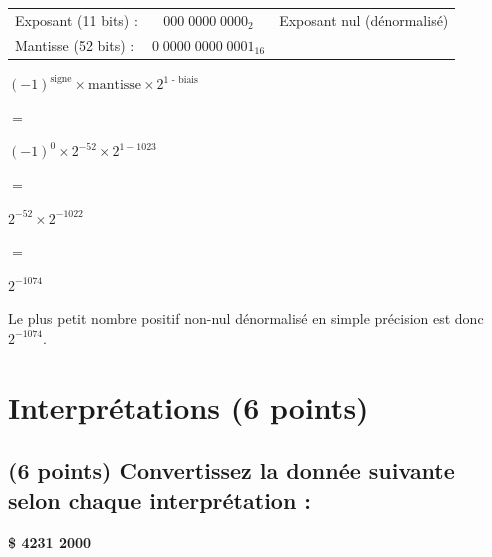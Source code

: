 \documentclass[11pt,a4paper]{article}
\begin{document}
\bigskip

\bigskip

\begin{tabular}{l c l}
Exposant (11 bits) :  & $ 000 \; 0000 \; 0000_{2} $ & Exposant nul (dénormalisé)\\
Mantisse (52 bits) : & $ 0 \; 0000 \; 0000 \; 0001_{16} $ & \\
\end{tabular}

\bigskip

\begin{center}
$ (-1)^{\text{signe}} \times \text{mantisse} \times 2^{\text{1 - biais}} $

\smallskip
$ = $
\smallskip

$ (-1)^{\text{0}} \times 2^{-52} \times 2^{1 - 1023} $

\smallskip
$ = $
\smallskip

$ 2^{-52} \times 2^{-1022} $

\smallskip
$ = $
\smallskip

$ 2^{-1074} $
\end{center}

Le plus petit nombre positif non-nul dénormalisé en simple précision est donc $ 2^{-1074} $.

\clearpage


\section{Interprétations (6 points)}

\subsection{(6 points) Convertissez la donnée suivante selon chaque interprétation : }

\bigskip

\begin{center}
\textbf{\Large \$ 4231 2000 }
\end{center}

\smallskip
\end{document}
